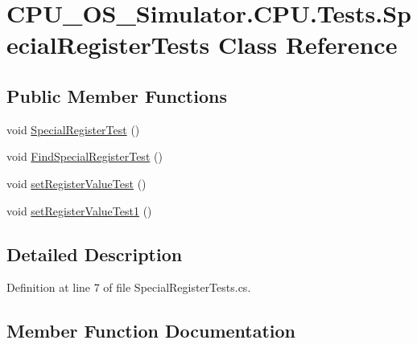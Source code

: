 \hypertarget{class_c_p_u___o_s___simulator_1_1_c_p_u_1_1_tests_1_1_special_register_tests}{}\section{C\+P\+U\+\_\+\+O\+S\+\_\+\+Simulator.\+C\+P\+U.\+Tests.\+Special\+Register\+Tests Class Reference}
\label{class_c_p_u___o_s___simulator_1_1_c_p_u_1_1_tests_1_1_special_register_tests}
\subsection*{Public Member Functions}
\begin{DoxyCompactItemize}
\item 
void \hyperlink{class_c_p_u___o_s___simulator_1_1_c_p_u_1_1_tests_1_1_special_register_tests_a1fb5b50362573ae62720d1c2b7e4a9ba}{Special\+Register\+Test} ()
\item 
void \hyperlink{class_c_p_u___o_s___simulator_1_1_c_p_u_1_1_tests_1_1_special_register_tests_a2897acd6a583aab1dd723b13c9f88e60}{Find\+Special\+Register\+Test} ()
\item 
void \hyperlink{class_c_p_u___o_s___simulator_1_1_c_p_u_1_1_tests_1_1_special_register_tests_a69f7c3f739036835145a8fadd7112d9e}{set\+Register\+Value\+Test} ()
\item 
void \hyperlink{class_c_p_u___o_s___simulator_1_1_c_p_u_1_1_tests_1_1_special_register_tests_a3c0a8e74b166d73fe40bbf4130917687}{set\+Register\+Value\+Test1} ()
\end{DoxyCompactItemize}


\subsection{Detailed Description}


Definition at line 7 of file Special\+Register\+Tests.\+cs.



\subsection{Member Function Documentation}
\hypertarget{class_c_p_u___o_s___simulator_1_1_c_p_u_1_1_tests_1_1_special_register_tests_a2897acd6a583aab1dd723b13c9f88e60}{}
